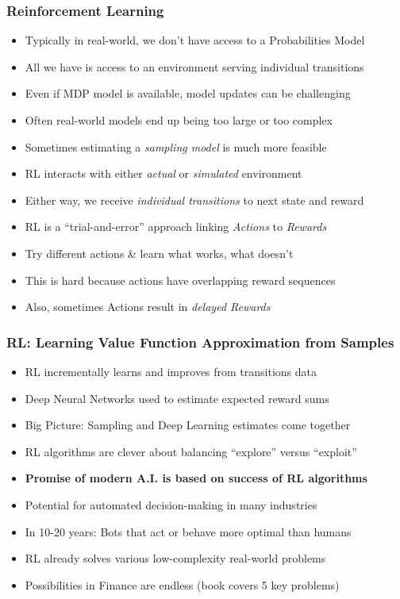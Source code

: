 \documentclass[handout]{beamer}
\begin{document}
\begin{frame}
\frametitle{Reinforcement Learning}
\pause
\begin{itemize}[<+->]
\item Typically in real-world, we don't have access to a Probabilities Model
\item All we have is access to an environment serving individual transitions
\item Even if MDP model is available, model updates can be challenging
\item Often real-world models end up being too large or too complex
\item Sometimes estimating a {\em sampling model} is much more feasible
\item RL interacts with either {\em actual} or {\em simulated} environment
\item Either way, we receive {\em individual transitions} to next state and reward
\item RL is a ``trial-and-error'' approach linking {\em Actions} to {\em Rewards}
\item Try different actions \& learn what works, what doesn't
\item This is hard because actions have overlapping reward sequences
\item Also, sometimes Actions result in {\em delayed Rewards}
\end{itemize}
\end{frame}

\begin{frame}
\frametitle{RL: Learning Value Function Approximation from Samples}
\pause
\begin{itemize}[<+->]
\item RL incrementally learns and improves from transitions data
\item Deep Neural Networks used to estimate expected reward sums 
\item Big Picture: Sampling and Deep Learning estimates come together
\item RL algorithms are clever about balancing  ``explore'' versus ``exploit''
\item {\bf Promise of modern A.I. is based on success of RL algorithms}
\item Potential for automated decision-making in many industries
\item In 10-20 years: Bots that act or behave more optimal than humans
\item RL already solves various low-complexity real-world problems
\item Possibilities in Finance are endless (book covers 5 key problems)
\end{itemize}
\end{frame}
\end{document}
